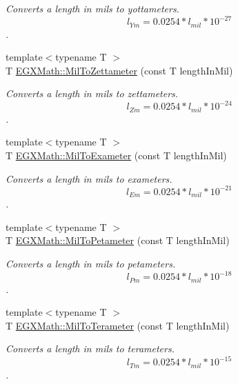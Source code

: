 \begin{DoxyCompactItemize}
\begin{DoxyCompactList}\small\item\em Converts a length in mils to yottameters. \[ l_{Ym}=0.0254* l_{mil} * 10^{-27} \]. \end{DoxyCompactList}\item 
{\footnotesize template$<$typename T $>$ }\\T \mbox{\hyperlink{group___e_g_x_math-_conversions-_length_conversions-_imperial-_mil-_s_i_ga431c92390fcf7f25c6c57e9a3124153b}{E\+G\+X\+Math\+::\+Mil\+To\+Zettameter}} (const T length\+In\+Mil)
\begin{DoxyCompactList}\small\item\em Converts a length in mils to zettameters. \[ l_{Zm}=0.0254* l_{mil} * 10^{-24} \]. \end{DoxyCompactList}\item 
{\footnotesize template$<$typename T $>$ }\\T \mbox{\hyperlink{group___e_g_x_math-_conversions-_length_conversions-_imperial-_mil-_s_i_gae24a05aa769e66474c602e6087fd7351}{E\+G\+X\+Math\+::\+Mil\+To\+Exameter}} (const T length\+In\+Mil)
\begin{DoxyCompactList}\small\item\em Converts a length in mils to exameters. \[ l_{Em}=0.0254* l_{mil} * 10^{-21} \]. \end{DoxyCompactList}\item 
{\footnotesize template$<$typename T $>$ }\\T \mbox{\hyperlink{group___e_g_x_math-_conversions-_length_conversions-_imperial-_mil-_s_i_ga43688f460a753350b8b4ac32c83bbf5e}{E\+G\+X\+Math\+::\+Mil\+To\+Petameter}} (const T length\+In\+Mil)
\begin{DoxyCompactList}\small\item\em Converts a length in mils to petameters. \[ l_{Pm}=0.0254* l_{mil} * 10^{-18} \]. \end{DoxyCompactList}\item 
{\footnotesize template$<$typename T $>$ }\\T \mbox{\hyperlink{group___e_g_x_math-_conversions-_length_conversions-_imperial-_mil-_s_i_gae1b1a9a71113ba048bcbfacdea2b6d11}{E\+G\+X\+Math\+::\+Mil\+To\+Terameter}} (const T length\+In\+Mil)
\begin{DoxyCompactList}\small\item\em Converts a length in mils to terameters. \[ l_{Tm}=0.0254* l_{mil} * 10^{-15} \]. \end{DoxyCompactList}\item 

\end{DoxyCompactItemize}

